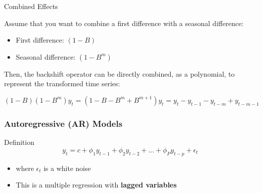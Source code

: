 \documentclass{beamer}
\begin{document}
\begin{frame}{Combined Effects}

Assume that you want to combine a first difference with a seasonal difference:
  
  \begin{itemize}
  \item First difference: $(1-B)$
  \item Seasonal difference: $(1-B^m)$
  \end{itemize}

  Then, the backshift operator can be directly combined, as a polynomial, to represent the transformed time series:

  \begin{equation*}
    (1-B)(1-B^m)y_t = (1 - B - B^m + B^{m+1})y_t = y_t - y_{t-1} - y_{t-m} + y_{t-m-1}
  \end{equation*}    
\end{frame}


\begin{frame}
  \frametitle{Autoregressive (AR) Models}

  \begin{block}{Definition}
    \begin{equation*}
      y_t = c + \phi_1 y_{t-1} + \phi_2 y_{t-2} + \dots + \phi_P y_{t-p} + \epsilon_t
    \end{equation*}

    \begin{itemize}
    \item where $\epsilon_t$ is a white noise
    \item This is a multiple regression with \textbf{lagged variables}
    \end{itemize}    
  \end{block}

\end{frame}
\end{document}
